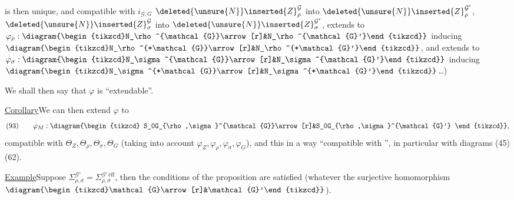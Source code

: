 is then unique, and compatible with \(i_{\mathcal{G},G}\)
\unsure{;}
\(\deleted{\unsure{N}}\inserted{Z}_\rho^{\mathcal{G}}\) into
\(\deleted{\unsure{N}}\inserted{Z}_\rho^{\mathcal{G}'}\),
\(\deleted{\unsure{N}}\inserted{Z}_\sigma^{\mathcal{G}}\) into
\(\deleted{\unsure{N}}\inserted{Z}_\sigma^{\mathcal{G}'}\),
 extends to
\(\varphi_\rho:\diagram{\begin{tikzcd}N_\rho^{\mathcal{G}}\arrow[r]&N_\rho^{\mathcal{G}'}\end{tikzcd}}\)
inducing
\(\diagram{\begin{tikzcd}N_\rho^{*\mathcal{G}}\arrow[r]&N_\rho^{*\mathcal{G}'}\end{tikzcd}}\),
and extends to
\(\varphi_\sigma:\diagram{\begin{tikzcd}N_\sigma^{\mathcal{G}}\arrow[r]&N_\sigma^{\mathcal{G}'}\end{tikzcd}}\)
inducing
\(\diagram{\begin{tikzcd}N_\sigma^{*\mathcal{G}}\arrow[r]&N_\sigma^{*\mathcal{G}'}\end{tikzcd}}\)\ldots)


We shall then say that \(\varphi\) is ``extendable''.

\uline{Corollary}\quad We can then extend \(\varphi\) to
\[
(93)\qquad\varphi_M:
\diagram{\begin{tikzcd}
S_0G_{\rho,\sigma}^{\mathcal{G}}\arrow[r]&S_0G_{\rho,\sigma}^{\mathcal{G}'}
\end{tikzcd}},
\]
compatible with \(\Theta_Z,\Theta_\rho,\Theta_\sigma,\Theta_G\)
(taking into account \(\varphi_Z,\varphi_\rho,\varphi_\sigma,\varphi_G\)),
and this in a way ``compatible with '', in particular
with diagrams (45) (62).

\uline{Example}\quad Suppose
\(\Sigma_{\rho,\sigma}^{\mathcal{G}'}=\Sigma_{\rho,\sigma}^{\mathcal{G}'\,\mathrm{eff}}\),
then the conditions of the proposition are 
satisfied (whatever the surjective homomorphism
\(\diagram{\begin{tikzcd}\mathcal{G}\arrow[r]&\mathcal{G}'\end{tikzcd}}\)).

